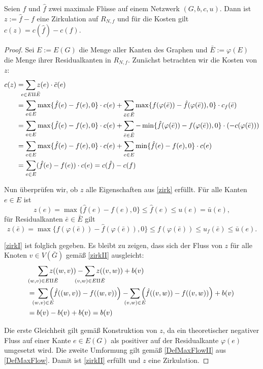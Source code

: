 \begin{lem}Seien $f$ und $\hat{f}$ zwei maximale Flüsse auf einem Netzwerk $(G,b,c,u)$. Dann ist $z:=\hat{f}-f$ eine Zirkulation auf $R_{N,f}$ und für die Kosten gilt $c(z)=c(\hat{f})-c(f)$.\end{lem}
\begin{proof}Sei $E:=E(G)$ die Menge aller Kanten des Graphen und $\bar{E}:=\varphi(E)$ die Menge ihrer Residualkanten in $R_{N,f}$. Zunächst betrachten wir die Kosten von $z$:
\begin{align*}c(z)&=\sum_{\mathclap{e\in E\amalg\bar{E}}} z(e)\cdot \bar{c}(e)\\
&=\sum_{e\in E}\max\{\hat{f}(e)-f(e),0\}\cdot c(e) + \sum_{\bar{e}\in \bar{E}}\max\{f(\varphi(\bar{e}))-\hat{f}(\varphi(\bar{e})),0\}\cdot c_f(\bar{e})\\
&=\sum_{e\in E}\max\{\hat{f}(e)-f(e),0\}\cdot c(e) + \sum_{\bar{e}\in \bar{E}}-\min\{\hat{f}(\varphi(\bar{e}))-f(\varphi(\bar{e})),0\}\cdot(- c(\varphi(\bar{e})))\\
&=\sum_{e\in E}\max\{\hat{f}(e)-f(e),0\}\cdot c(e) + \sum_{e\in E}\min\{\hat{f}(e)-f(e),0\}\cdot c(e)\\
&=\sum_{e\in E} (\hat{f}(e)-f(e))\cdot c(e) = c(\hat{f})-c(f)
\end{align*}

Nun überprüfen wir, ob $z$ alle Eigenschaften aus \cref{zirk} erfüllt. Für alle Kanten $e\in E$ ist
\begin{equation*}z(e)=\max\{\hat{f}(e)-f(e),0\}\leq\hat{f}(e)\leq u(e)=\bar{u}(e),\end{equation*}
für Residualkanten $\bar{e}\in \bar{E}$ gilt
\begin{equation*}z(\bar{e})=\max\{f(\varphi(\bar{e}))-\hat{f}(\varphi(\bar{e})),0\}\leq f(\varphi(\bar{e}))\leq u_f(\bar{e})\leq \bar{u}(e).\end{equation*}

\cref{zirkI} ist folglich gegeben. Es bleibt zu zeigen, dass sich der Fluss von $z$ für alle Knoten $v\in V(\bar{G})$ gemäß \cref{zirkII} ausgleicht:
\begin{align*}&\sum_{\mathclap{(w,v)\in E\amalg\bar{E}}} z((w,v)) - \sum_{\mathclap{(v,w)\in E\amalg\bar{E}}} z((v,w)) + b(v)\\
={}&\sum_{\mathclap{(w,v)\in E}} \Big(\hat{f}((w,v)) -  f((w,v))\Big) -  \sum_{\mathclap{(v,w)\in E}} \Big(\hat{f}((v,w)) - f((v,w))\Big) + b(v)\\
={}&b(v)-b(v)+b(v)=b(v)\end{align*}

Die erste Gleichheit gilt gemäß Konstruktion von $z$, da ein theoretischer negativer Fluss auf einer Kante $e\in E(G)$ als positiver auf der Residualkante $\varphi(e)$ umgesetzt wird. Die zweite Umformung gilt gemäß \cref{DefMaxFlowII} aus \cref{DefMaxFlow}. Damit ist \cref{zirkII} erfüllt und $z$ eine Zirkulation.\end{proof}


